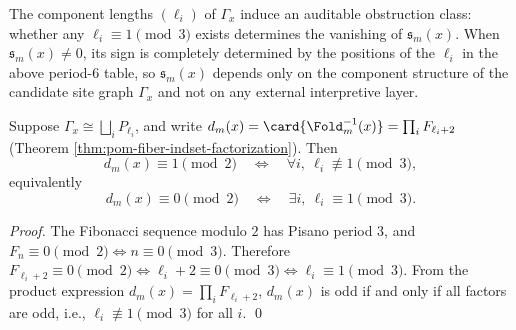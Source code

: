 \begin{corollary}\label{cor:pom-fiber-signed-index-mod3}
The component lengths \((\ell_i)\) of \(\Gamma_x\) induce an auditable obstruction class: whether any \(\ell_i\equiv 1\pmod 3\) exists determines the vanishing of \(\mathfrak{s}_m(x)\).
When \(\mathfrak{s}_m(x)\neq 0\), its sign is completely determined by the positions of the \(\ell_i\) in the above period-\(6\) table, so \(\mathfrak{s}_m(x)\) depends only on the component structure of the candidate site graph \(\Gamma_x\) and not on any external interpretive layer.
\end{corollary}

\begin{corollary}\label{cor:pom-fiber-parity-mod3}
Suppose \(\Gamma_x\cong\bigsqcup_i P_{\ell_i}\), and write
\(
d_m(x)=\card{\Fold_m^{-1}(x)}=\prod_i F_{\ell_i+2}
\)
(Theorem \ref{thm:pom-fiber-indset-factorization}).
Then
\[
d_m(x)\equiv 1\pmod 2
\quad\Longleftrightarrow\quad
\forall i,\ \ell_i\not\equiv 1\pmod 3,
\]
equivalently
\[
d_m(x)\equiv 0\pmod 2
\quad\Longleftrightarrow\quad
\exists i,\ \ell_i\equiv 1\pmod 3.
\]
\end{corollary}
\begin{proof}
The Fibonacci sequence modulo \(2\) has Pisano period \(3\), and
\(
F_n\equiv 0\pmod 2\iff n\equiv 0\pmod 3
\).
Therefore
\(
F_{\ell_i+2}\equiv 0\pmod 2\iff \ell_i+2\equiv 0\pmod 3\iff \ell_i\equiv 1\pmod 3
\).
From the product expression \(d_m(x)=\prod_i F_{\ell_i+2}\), \(d_m(x)\) is odd if and only if all factors are odd, i.e., \(\ell_i\not\equiv 1\pmod 3\) for all \(i\). \qed
\end{proof}




